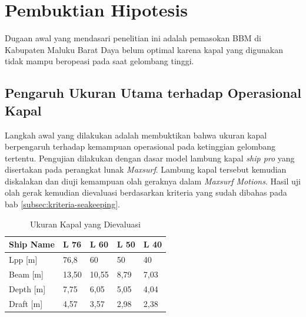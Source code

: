 \section{Pembuktian Hipotesis}
\label{sec:bukti-hipotesis}

Dugaan awal yang mendasari penelitian ini adalah pemasokan BBM di Kabupaten Maluku Barat Daya belum optimal karena kapal yang digunakan tidak mampu beropeasi pada saat gelombang tinggi.

\subsection{Pengaruh Ukuran Utama terhadap Operasional Kapal}
\label{subsec:ukuran-vs-operasional}

Langkah awal yang dilakukan adalah membuktikan bahwa ukuran kapal berpengaruh terhadap kemampuan operasional pada ketinggian gelombang tertentu. Pengujian dilakukan dengan dasar model lambung kapal \emph{ship pro} yang disertakan pada perangkat lunak \emph{Maxsurf}. Lambung kapal tersebut kemudian diskalakan dan diuji kemampuan olah geraknya dalam \emph{Maxsurf Motions}. Hasil uji olah gerak kemudian dievaluasi berdasarkan kriteria yang sudah dibahas pada bab \ref{subsec:kriteria-seakeeping}.

\begin{table}[!ht]
    \centering
    \caption{Ukuran Kapal yang Dievaluasi}
    \label{tab:variasi-ship-dimensions}
    \begin{tabular}{|l|l|l|l|l|}
    \hline
    Ship Name & L 76  & L 60  & L 50 & L 40 \\ \hline
    Lpp [m]      & 76,8  & 60    & 50   & 40   \\ \hline
    Beam [m]      & 13,50 & 10,55 & 8,79 & 7,03 \\ \hline
    Depth [m]    & 7,75  & 6,05  & 5,05 & 4,04 \\ \hline
    Draft [m]    & 4,57  & 3,57  & 2,98 & 2,38 \\ \hline
    \end{tabular}
\end{table} 

